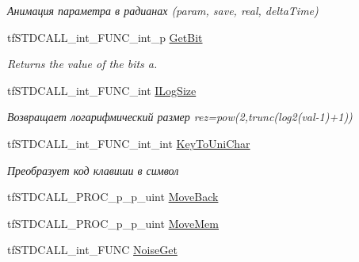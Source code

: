 \begin{DoxyCompactItemize}
\begin{DoxyCompactList}\small\item\em Анимация параметра в радианах (param, save, real, delta\-Time) \end{DoxyCompactList}\item 
\hypertarget{structs_functions_extension_c_p_u_a2ae7800aded630c3b1aa7566d8563937}{tf\-S\-T\-D\-C\-A\-L\-L\-\_\-int\-\_\-\-F\-U\-N\-C\-\_\-int\-\_\-p \hyperlink{structs_functions_extension_c_p_u_a2ae7800aded630c3b1aa7566d8563937}{Get\-Bit}}\label{structs_functions_extension_c_p_u_a2ae7800aded630c3b1aa7566d8563937}

\begin{DoxyCompactList}\small\item\em Returns the value of the bits a. \end{DoxyCompactList}\item 
\hypertarget{structs_functions_extension_c_p_u_ab6793ae0fab6ebad55aebb770c9dedb3}{tf\-S\-T\-D\-C\-A\-L\-L\-\_\-int\-\_\-\-F\-U\-N\-C\-\_\-int \hyperlink{structs_functions_extension_c_p_u_ab6793ae0fab6ebad55aebb770c9dedb3}{I\-Log\-Size}}\label{structs_functions_extension_c_p_u_ab6793ae0fab6ebad55aebb770c9dedb3}

\begin{DoxyCompactList}\small\item\em Возвращает логарифмический размер rez=pow(2,trunc(log2(val-\/1)+1)) \end{DoxyCompactList}\item 
\hypertarget{structs_functions_extension_c_p_u_ac736f2b4e9844a9e3d44097c0606e62e}{tf\-S\-T\-D\-C\-A\-L\-L\-\_\-int\-\_\-\-F\-U\-N\-C\-\_\-int\-\_\-int \hyperlink{structs_functions_extension_c_p_u_ac736f2b4e9844a9e3d44097c0606e62e}{Key\-To\-Uni\-Char}}\label{structs_functions_extension_c_p_u_ac736f2b4e9844a9e3d44097c0606e62e}

\begin{DoxyCompactList}\small\item\em Преобразует код клавиши в символ \end{DoxyCompactList}\item 
tf\-S\-T\-D\-C\-A\-L\-L\-\_\-\-P\-R\-O\-C\-\_\-p\-\_\-p\-\_\-uint \hyperlink{structs_functions_extension_c_p_u_a6a0885adc4ac6c204dec8a2595f9a8a1}{Move\-Back}
\item 
tf\-S\-T\-D\-C\-A\-L\-L\-\_\-\-P\-R\-O\-C\-\_\-p\-\_\-p\-\_\-uint \hyperlink{structs_functions_extension_c_p_u_a4f255e3f81664fc9e3f47186f8f80e08}{Move\-Mem}
\item 
\hypertarget{structs_functions_extension_c_p_u_ad9e72c6197fd0e9d5eb07577e28c1566}{tf\-S\-T\-D\-C\-A\-L\-L\-\_\-int\-\_\-\-F\-U\-N\-C \hyperlink{structs_functions_extension_c_p_u_ad9e72c6197fd0e9d5eb07577e28c1566}{Noise\-Get}}\label{structs_functions_extension_c_p_u_ad9e72c6197fd0e9d5eb07577e28c1566}


\end{DoxyCompactItemize}
